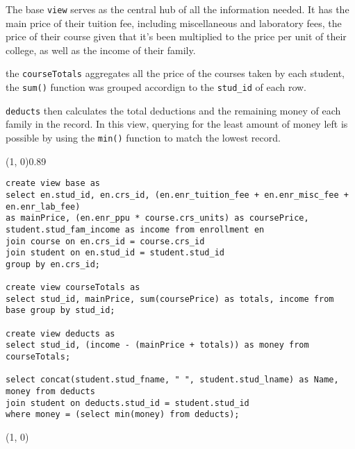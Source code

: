 
The base \texttt{view} serves as the central hub of all the information needed. It has the main price of their tuition fee, including miscellaneous and laboratory fees, the price of their course given that it's been multiplied to the price per unit of their college, as well as the income of their family.

the \texttt{courseTotals} aggregates all the price of the courses taken by each student, the \texttt{sum()} function was grouped accordign to the \texttt{stud\_id} of each row. 

\texttt{deducts} then calculates the total deductions and the remaining money of each family in the record. In this view, querying for the least amount of money left is possible by using the \texttt{min()} function to match the lowest record.
\vspace{\baselineskip}

\sol{}
\noindent\line(1, 0){0.89\linewidth}
\begin{verbatim}
create view base as
select en.stud_id, en.crs_id, (en.enr_tuition_fee + en.enr_misc_fee + en.enr_lab_fee)
as mainPrice, (en.enr_ppu * course.crs_units) as coursePrice, student.stud_fam_income as income from enrollment en
join course on en.crs_id = course.crs_id
join student on en.stud_id = student.stud_id
group by en.crs_id;

create view courseTotals as
select stud_id, mainPrice, sum(coursePrice) as totals, income from base group by stud_id;

create view deducts as
select stud_id, (income - (mainPrice + totals)) as money from courseTotals;

select concat(student.stud_fname, " ", student.stud_lname) as Name, money from deducts 
join student on deducts.stud_id = student.stud_id
where money = (select min(money) from deducts);
\end{verbatim}
\noindent\line(1, 0){\linewidth}
